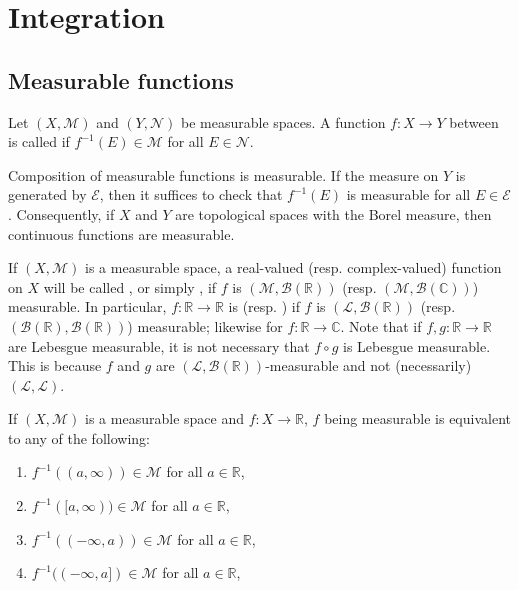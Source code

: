 \documentclass[12pt]{article}	%
\begin{document}
\section{Integration}

\subsection{Measurable functions}

\begin{defn}
	Let $(X, \mathcal{M})$ and $(Y, \mathcal{N})$ be measurable spaces. A function $f : X \to Y$ between is called  if $f^{-1}(E) \in \mathcal{M}$ for all $E \in \mathcal{N}$.
\end{defn}

\begin{prop}
	Composition of measurable functions is measurable. If the measure on $Y$ is generated by $\mathcal{E}$, then it suffices to check that $f^{-1}(E)$ is measurable for all $E \in \mathcal{E}$. Consequently, if $X$ and $Y$ are topological spaces with the Borel measure, then continuous functions are measurable.
\end{prop}

If $(X, \mathcal{M})$ is a measurable space, a real-valued (resp. complex-valued) function on $X$ will be called , or simply , if $f$ is $(\mathcal{M}, \mathcal{B}(\mathbb{R}))$ (resp. $(\mathcal{M}, \mathcal{B}(\mathbb{C}))$) measurable. In particular, $f : \mathbb{R} \to \mathbb{R}$ is  (resp. )  if $f$ is $(\mathcal{L}, \mathcal{B}(\mathbb{R}))$ (resp. $(\mathcal{B}(\mathbb{R}), \mathcal{B}(\mathbb{R}))$) measurable; likewise for $f : \mathbb{R} \to \mathbb{C}$. \newline
Note that if $f, g : \mathbb{R} \to \mathbb{R}$ are Lebesgue measurable, it is not necessary that $f \circ g$ is Lebesgue measurable. This is because $f$ and $g$ are $(\mathcal{L}, \mathcal{B}(\mathbb{R}))$-measurable and not (necessarily) $(\mathcal{L}, \mathcal{L})$.

\begin{cor}
	If $(X, \mathcal{M})$ is a measurable space and $f : X \to \mathbb{R}$, $f$ being measurable is equivalent to any of the following:
	\begin{enumerate}
		\item $f^{-1}((a, \infty)) \in \mathcal{M}$ for all $a \in \mathbb{R}$,
		\item $f^{-1}([a, \infty)) \in \mathcal{M}$ for all $a \in \mathbb{R}$,
		\item $f^{-1}((-\infty, a)) \in \mathcal{M}$ for all $a \in \mathbb{R}$,
		\item $f^{-1}((-\infty, a]) \in \mathcal{M}$ for all $a \in \mathbb{R}$,
	\end{enumerate}
\end{cor}
\end{document}

